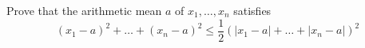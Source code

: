 Prove that the arithmetic mean $a$ of $x_1,\ldots ,x_n$ satisfies\[ (x_1-a)^2+\ldots +(x_n-a)^2\le \frac{1}{2}(|x_1-a|+\ldots +|x_n-a|)^2\]